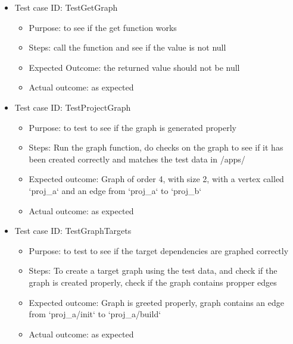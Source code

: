 \documentclass[11pt]{article}
\begin{document}
\begin{itemize}
    \item Test case ID: TestGetGraph
    \begin{itemize}
        \item Purpose: to see if the get function works
        \item Steps: call the function and see if the value is not null
        \item Expected Outcome: the returned value should not be null
        \item Actual outcome: as expected
    \end{itemize}
\end{itemize}

\begin{itemize}
    \item Test case ID: TestProjectGraph
    \begin{itemize}
        \item Purpose: to test to see if the graph is generated properly
        \item Steps: Run the graph function, do checks on the graph to see if it has been created correctly and matches the test data in /apps/
        \item Expected outcome: Graph of order 4, with size 2, with a vertex called `proj\_a` and an edge from `proj\_a` to `proj\_b`
        \item Actual outcome: as expected
    \end{itemize}
\end{itemize}

\begin{itemize}
    \item Test case ID: TestGraphTargets
    \begin{itemize}
        \item Purpose: to test to see if the target dependencies are graphed correctly
        \item Steps: To create a target graph using the test data, and check if the graph is created properly, check if the graph contains propper edges
        \item Expected outcome: Graph is greeted properly, graph contains an edge from `proj_a/init` to `proj_a/build`
        \item Actual outcome: as expected
    \end{itemize}
\end{itemize}
\end{document}
